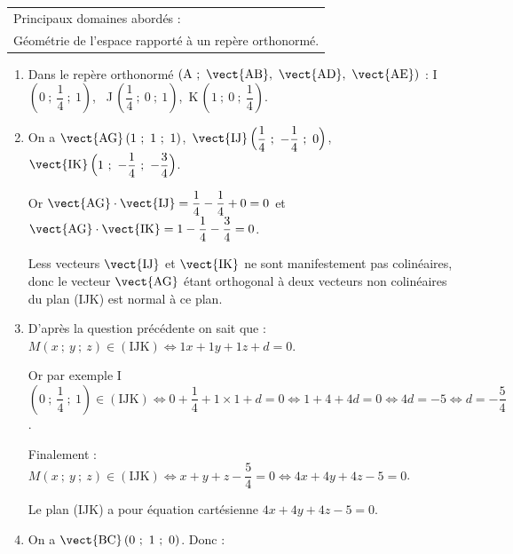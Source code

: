 \medskip

\begin{tabular}{|l|}\hline
Principaux domaines abordés :\\
Géométrie de l'espace rapporté à un repère orthonormé.\\ \hline
\end{tabular}

\bigskip













\begin{enumerate}
\item 
Dans le repère orthonormé $\left(\text{A}~;~\vect{\text{AB}},~\vect{\text{AD}},~\vect{\text{AE}}\right)$ : 
I\,$\left(0~;~\dfrac{1}{4}~;~1 \right)$, \, J\,$\left(\dfrac{1}{4}~;~0~;~1 \right)$,\, K\,$\left(1~;~0~;~\dfrac{1}{4}\right)$.
\item 
On a $\vect{\text{AG}} \left (1~;~1~;~1\right )$,\, $\vect{\text{IJ}}\begin{pmatrix}\dfrac{1}{4}~;~- \dfrac{1}{4}~;~0\end{pmatrix}$, \, $\vect{\text{IK}}\begin{pmatrix}1~;~- \dfrac{1}{4}~;~-\dfrac{3}{4}\end{pmatrix}$.

Or $\vect{\text{AG}} \cdot \vect{\text{IJ}} =  \dfrac{1}{4} - \dfrac{1}{4} + 0 = 0$ et $\vect{\text{AG}} \cdot \vect{\text{IK}} = 1 - \dfrac{1}{4} - \dfrac{3}{4} = 0$.

Less vecteurs $\vect{\text{IJ}}$ et $\vect{\text{IK}}$ ne sont manifestement pas colinéaires, donc le vecteur $\vect{\text{AG}}$ étant orthogonal à deux vecteurs non colinéaires du plan (IJK) est normal à ce plan.
\item 
D'après la question précédente on sait que :
$M(x~;~y~;~z) \in (\text{IJK}) \iff 1x + 1y + 1z + d = 0$.

Or par exemple I$\left(0~;~\dfrac{1}{4}~;~1 \right) \in (\text{IJK}) \iff 0 + \dfrac{1}{4} + 1\times 1 + d = 0 \iff 1 + 4 + 4d = 0 \iff 4d = - 5 \iff d = - \dfrac{5}{4}$.

Finalement :
$M(x~;~y~;~z) \in (\text{IJK}) \iff x + y + z - \dfrac{5}{4} = 0 \iff 4x + 4y + 4z - 5 = 0$.

Le plan (IJK) a pour équation cartésienne $4x + 4y + 4z - 5 = 0$.

\item 
On a $\vect{\text{BC}}\left (0~;~1~;~0 \right  )$. Donc :


\end{enumerate}
